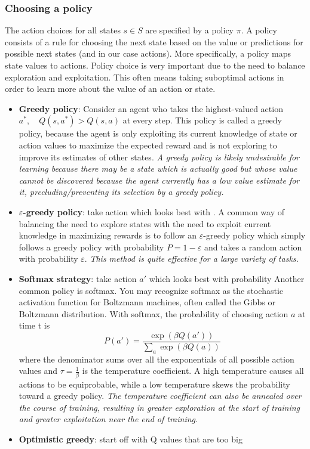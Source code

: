 \documentclass[11pt]{article}
\begin{document}
\subsubsection{Choosing a policy}
The action choices for all states $s \in S$ are specified by a policy $\pi$. A policy consists of a rule for choosing the next state based on the value or predictions for possible next states (and in our case actions). More specifically, a policy maps state values to actions. Policy choice is very important due to the need to balance exploration and exploitation. 
This often means taking suboptimal actions in order to learn more about the value of an action or state. 
\begin{itemize}
	\item \textbf{Greedy policy}: Consider an agent who takes the highest-valued action $a^*,\quad Q(s,a^*)>Q(s,a)$ at every step. This policy is called a greedy policy, because the agent is only exploiting its current knowledge of state or action values to maximize the expected reward and is not exploring to improve its estimates of other states. \textit{A greedy policy is likely undesirable for learning because there may be a state which is actually good but whose value cannot be discovered because the agent currently has a low value estimate for it, precluding/preventing its selection by a greedy policy.}
	\item \textbf{$\varepsilon$-greedy policy}: take action which looks best with . A common way of balancing the need to explore states with the need to exploit current knowledge in maximizing rewards is to follow an $\varepsilon$-greedy policy which simply follows a greedy policy with probability $P = 1-\varepsilon$ and takes a random action with probability $\varepsilon$. \textit{This method is quite effective for a large variety of tasks.} 
	\item \textbf{Softmax strategy}: take action $a'$ which looks best with probability 
	Another common policy is softmax. You may recognize softmax as the stochastic activation function for Boltzmann machines, often called the Gibbs or Boltzmann distribution. With softmax, the probability of choosing action $a$ at time t is 
	\[
	P(a') = \frac{\exp{(\beta Q(a'))}}{\sum_a \exp{(\beta Q(a))}}
	\]
	where the denominator sums over all the exponentials of all possible action values and $\tau=\frac{1}{\beta}$ is the temperature coefficient. A high temperature causes all actions to be equiprobable, while a low temperature skews the probability toward a greedy policy. \textit{The temperature coefficient can also be annealed over the course of training, resulting in greater exploration at the start of training and greater exploitation near the end of training.} 
	\item \textbf{Optimistic greedy}: start off with Q values that are too big
\end{itemize}
\end{document}
